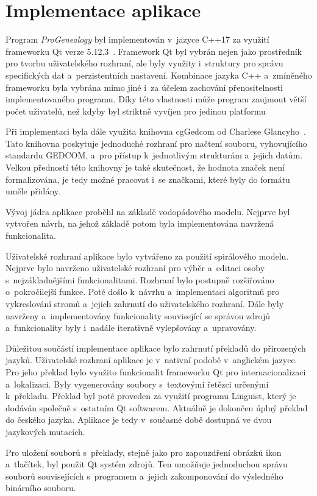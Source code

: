 \chapter{Implementace aplikace}
\label{chap:implem}
Program \emph{ProGenealogy} byl implementován v~jazyce C++17 za využití frameworku Qt verze 5.12.3~\cite{bib:QtFramework}. Framework Qt byl vybrán nejen jako prostředník pro tvorbu uživatelského rozhraní, ale byly využity i~struktury pro správu specifických dat a~perzistentních nastavení. Kombinace jazyka C++ a~zmíněného frameworku byla vybrána mimo jiné i~za účelem zachování přenositelnosti implementovaného programu. Díky této vlastnosti může program zaujmout větší počet uživatelů, než kdyby byl striktně vyvíjen pro jedinou platformu \par
Při implementaci byla dále využita knihovna cgGedcom od Charlese Glancyho~\cite{bib:LibCgGedcom}. Tato knihovna poskytuje jednoduché rozhraní pro načtení souboru, vyhovujícího standardu GEDCOM, a~pro přístup k~jednotlivým strukturám a~jejich datům. Velkou předností této knihovny je také skutečnost, že hodnota značek není formalizována, je tedy možné pracovat i~se značkami, které byly do formátu uměle přidány. \par
Vývoj jádra aplikace proběhl na základě vodopádového modelu. Nejprve byl vytvořen návrh, na jehož základě potom byla implementována navržená funkcionalita. \par
Uživatelské rozhraní aplikace bylo vytvářeno za použití spirálového modelu. Nejprve bylo navrženo uživatelské rozhraní pro výběr a~editaci osoby s~nejzákladnějšími funkcionalitami. Rozhraní bylo postupně rozšiřováno o~pokročilejší funkce. Poté došlo k~návrhu a~implementaci algoritmů pro vykreslování stromů a~jejich zahrnutí do uživatelského rozhraní. Dále byly navrženy a~implementovány funkcionality související se správou zdrojů a~funkcionality byly i~nadále iterativně vylepšovány a~upravovány.\par
Důležitou součástí implementace aplikace bylo zahrnutí překladů do přirozených jazyků. Uživatelské rozhraní aplikace je v~nativní podobě v~anglickém jazyce. Pro jeho překlad bylo využito funkcionalit frameworku Qt pro internacionalizaci a~lokalizaci. Byly vygenerovány soubory s~textovými řetězci určenými k~překladu. Překlad byl poté proveden za využití programu Linguist, který je dodáván společně s~ostatním Qt softwarem. Aktuálně je dokončen úplný překlad do českého jazyka. Aplikace je tedy v~současné době dostupná ve dvou jazykových mutacích.\par
Pro uložení souborů s~překlady, stejně jako pro zapouzdření obrázků ikon a~tlačítek, byl použit Qt systém zdrojů. Ten umožňuje jednoduchou správu souborů souvisejících s~programem a~jejich zakomponování do výsledného binárního souboru. \par
